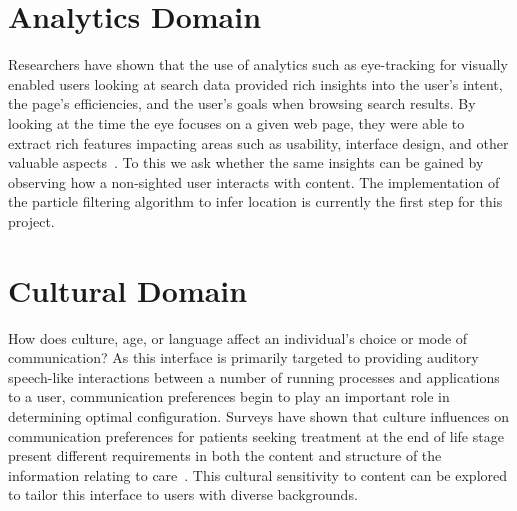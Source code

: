 \section{                  Analytics Domain                                   }

Researchers have shown that the use of analytics such as eye-tracking for
visually enabled users looking at search data provided rich insights into the
user's intent, the page's efficiencies, and the user's goals when browsing
search results.  By looking at the time the eye focuses on a given web page,
they were able to extract rich features impacting areas such as usability,
interface design, and other valuable aspects~\cite{granka2004eye}.  To this we
ask whether the same insights can be gained by observing how a non-sighted user
interacts with content.  The implementation of the particle filtering algorithm
to infer location is currently the first step for this project.



\section{                  Cultural Domain                                    }

How does culture, age, or language affect an individual's choice or mode of
communication?  As this interface is primarily targeted to providing auditory
speech-like interactions between a number of running processes and applications
to a user, communication preferences begin to play an important role in
determining optimal configuration.  Surveys have shown that culture influences
on communication preferences for patients seeking treatment at the end of life
stage present different requirements in both the content and structure of the
information relating to care~\cite{shrank2005focus}. This cultural sensitivity
to content can be explored to tailor this interface to users with diverse
backgrounds.
